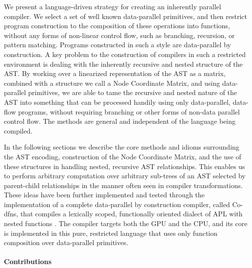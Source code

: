 ﻿\documentclass[numbers,10pt,preprint]{sigplanconf}
\begin{document}
We present a language-driven strategy for creating an inherently parallel compiler. We select a set of well known data-parallel primitives, and then restrict program construction to the composition of these operations into functions, without any forms of non-linear control flow, such as branching, recursion, or pattern matching. Programs constructed in such a style are data-parallel by construction. A key problem to the construction of compilers in such a restricted environment is dealing with the inherently recursive and nested structure of the AST. By working over a linearized representation of the AST as a matrix, combined with a structure we call a Node Coordinate Matrix, and using data-parallel primitives, we are able to tame the recursive and nested nature of the AST into something that can be processed handily using only data-parallel, data-flow programs, without requiring branching or other forms of non-data parallel control flow. The methods are general and independent of the language being compiled.

In the following sections we describe the core methods and idioms surrounding the AST encoding, construction of the Node Coordinate Matrix, and the use of these structures in handling nested, recursive AST relationships. This enables us to perform arbitrary computation over arbitrary sub-trees of an AST selected by parent-child relationships in the manner often seen in compiler transformations. These ideas have been further implemented and tested through the implementation of a complete data-parallel by construction compiler, called Co-dfns, that compiles a lexically scoped, functionally oriented dialect of APL with nested functions \cite{hsu2014co,hsu2015accelerating}. The compiler targets both the GPU and the CPU, and its core is implemented in this pure, restricted language that uses only function composition over data-parallel primitives.

\paragraph{Contributions}
\end{document}
